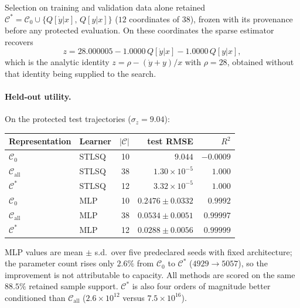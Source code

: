 Selection on training and validation data alone retained
$\mathcal{C}^{*}=\mathcal{C}_0\cup\{Q[\dot y|x],\,Q[y|x]\}$
($12$ coordinates of $38$), frozen with its provenance before any protected
evaluation. On these coordinates the sparse estimator recovers
\begin{equation}
  z = 28.000005 - 1.0000\,Q[\dot y|x] - 1.0000\,Q[y|x],
  \label{eq:recovered-z}
\end{equation}
which is the analytic identity $z=\rho-(\dot y+y)/x$ with $\rho=28$, obtained
without that identity being supplied to the search.

\paragraph{Held-out utility.}
On the protected test trajectories ($\sigma_z=9.04$):

\begin{center}
\begin{tabular}{llrrr}
\hline
Representation & Learner & $|\mathcal{C}|$ & test RMSE & $R^2$ \\
\hline
$\mathcal{C}_0$ & STLSQ & 10 & $9.044$ & $-0.0009$ \\
$\mathcal{C}_{\mathrm{all}}$ & STLSQ & 38 & $1.30\times10^{-5}$ & $1.000$ \\
$\mathcal{C}^{*}$ & STLSQ & 12 & $3.32\times10^{-5}$ & $1.000$ \\
$\mathcal{C}_0$ & MLP & 10 & $0.2476 \pm 0.0332$ & $0.9992$ \\
$\mathcal{C}_{\mathrm{all}}$ & MLP & 38 & $0.0534 \pm 0.0051$ & $0.99997$ \\
$\mathcal{C}^{*}$ & MLP & 12 & $0.0288 \pm 0.0056$ & $0.99999$ \\
\hline
\end{tabular}
\end{center}

\noindent
MLP values are mean $\pm$ s.d.\ over five predeclared seeds with fixed
architecture; the parameter count rises only $2.6\%$ from $\mathcal{C}_0$ to
$\mathcal{C}^{*}$ ($4929\rightarrow5057$), so the improvement is not attributable
to capacity. All methods are scored on the same $88.5\%$ retained sample support.
$\mathcal{C}^{*}$ is also four orders of magnitude better conditioned than
$\mathcal{C}_{\mathrm{all}}$ ($2.6\times10^{12}$ versus $7.5\times10^{16}$).


